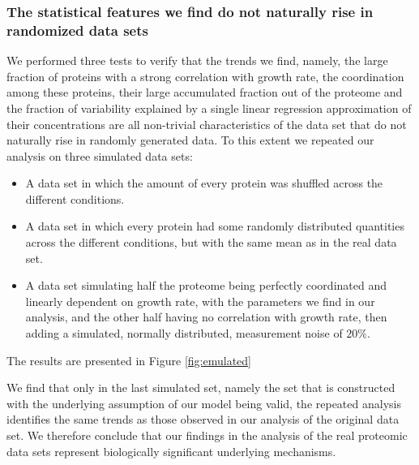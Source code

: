 \subsubsection{The statistical features we find do not naturally rise in randomized data sets}
We performed three tests to verify that the trends we find, namely, the large fraction of proteins with a strong correlation with growth rate, the coordination among these proteins, their large accumulated fraction out of the proteome and the fraction of variability explained by a single linear regression approximation of their concentrations are all non-trivial characteristics of the data set that do not naturally rise in randomly generated data.
To this extent we repeated our analysis on three simulated data sets:
\begin{itemize}
\item A data set in which the amount of every protein was shuffled across the different conditions.
\item A data set in which every protein had some randomly distributed quantities across the different conditions, but with the same mean as in the real data set.
\item A data set simulating half the proteome being perfectly coordinated and linearly dependent on growth rate, with the parameters we find in our analysis, and the other half having no correlation with growth rate, then adding a simulated, normally distributed, measurement noise of $20\%$.
\end{itemize}
The results are presented in Figure \ref{fig:emulated}

We find that only in the last simulated set, namely the set that is constructed with the underlying assumption of our model being valid, the repeated analysis identifies the same trends as those observed in our analysis of the original data set.
We therefore conclude that our findings in the analysis of the real proteomic data sets represent biologically significant underlying mechanisms.